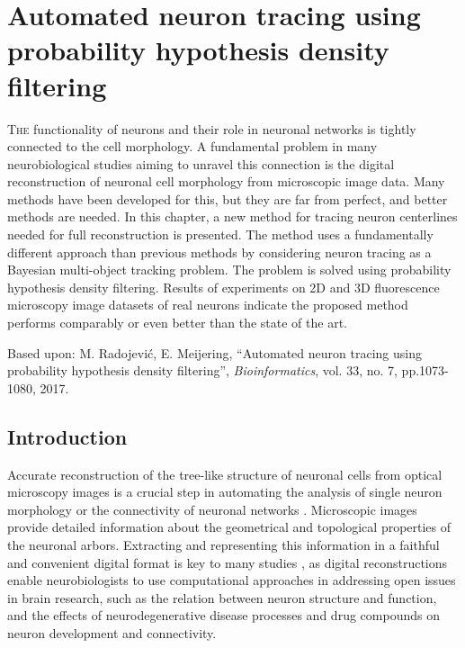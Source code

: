 %
%
\chpos{15mm}{8mm}
\chapter[Automated neuron tracing using probability hypothesis density filtering]{Automated neuron tracing using probability hypothesis density filtering}
\label{ch3:phd}
{\small \lettrine{T}{he} functionality of neurons and their role in neuronal networks is tightly connected to the cell morphology. A fundamental problem in many neurobiological studies aiming to unravel this connection is the digital reconstruction of neuronal cell morphology from microscopic image data. Many methods have been developed for this, but they are far from perfect, and better methods are needed. In this chapter, a new method for tracing neuron centerlines needed for full reconstruction is presented. The method uses a fundamentally different approach than previous methods by considering neuron tracing as a Bayesian multi-object tracking problem. The problem is solved using probability hypothesis density filtering. Results of experiments on 2D and 3D fluorescence microscopy image datasets of real neurons indicate the proposed method performs comparably or even better than the state of the art.\par}
\vspace*{22em}
\begin{publish}
	Based upon: M. Radojevi\'{c}, E. Meijering, ``Automated neuron tracing using probability hypothesis density filtering'', \textit{Bioinformatics}, vol. 33, no. 7, pp.1073-1080, 2017.   
\end{publish}

\section{Introduction}
\label{sec:introduction}
Accurate reconstruction of the tree-like structure of neuronal cells from optical microscopy images is a crucial step in automating the analysis of single neuron morphology or the connectivity of neuronal networks \cite{meijering2010neuron, donohue2011automated, peng2015bigneuron}. Microscopic images provide detailed information about the geometrical and topological properties of the neuronal arbors. Extracting and representing this information in a faithful and convenient digital format is key to many studies \cite{ascoli2002computational, ascoli2007neuromorpho, svoboda2011past, senft2011brief, halavi2012digital, lu2015quantitative}, as digital reconstructions enable neurobiologists to use computational approaches in addressing open issues in brain research, such as the relation between neuron structure and function, and the effects of neurodegenerative disease processes and drug compounds on neuron development and connectivity.

